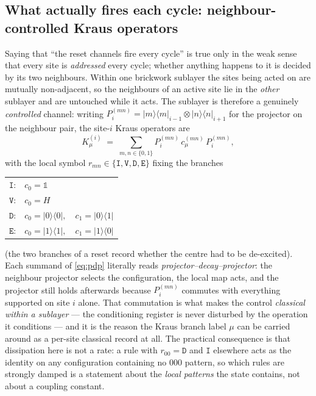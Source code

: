 \documentclass[11pt]{article}
\newcommand{\rt}[1]{\texttt{#1}}
\providecommand{\ket}[1]{|#1\rangle}
\providecommand{\bra}[1]{\langle #1|}
\begin{document}
\subsection{What actually fires each cycle: neighbour-controlled Kraus operators}
\label{sec:kraus}
Saying that ``the reset channels fire every cycle'' is true only in the weak
sense that every site is \emph{addressed} every cycle; whether anything happens
to it is decided by its two neighbours. Within one brickwork sublayer the sites
being acted on are mutually non-adjacent, so the neighbours of an active site lie
in the \emph{other} sublayer and are untouched while it acts. The sublayer is
therefore a genuinely \emph{controlled} channel: writing
$P^{(mn)}_i=\ket m\!\bra m_{i-1}\otimes\ket n\!\bra n_{i+1}$ for the projector on
the neighbour pair, the site-$i$ Kraus operators are
\begin{equation}
  K^{(i)}_\mu \;=\; \sum_{m,n\in\{0,1\}} P^{(mn)}_i\, c^{(mn)}_\mu\, P^{(mn)}_i ,
  \label{eq:pdp}
\end{equation}
with the local symbol $r_{mn}\in\{\rt I,\rt V,\rt D,\rt E\}$ fixing the branches
\begin{center}\small
\begin{tabular}{ll}
$\rt I$: & $c_0=\mathbb 1$ \\
$\rt V$: & $c_0=H$ \\
$\rt D$: & $c_0=\ket0\!\bra0,\quad c_1=\ket0\!\bra1$ \\
$\rt E$: & $c_0=\ket1\!\bra1,\quad c_1=\ket1\!\bra0$
\end{tabular}
\end{center}
(the two branches of a reset record whether the centre had to be de-excited).
Each summand of \eqref{eq:pdp} literally reads \emph{projector--decay--projector}:
the neighbour projector selects the configuration, the local map acts, and the
projector still holds afterwards because $P^{(mn)}_i$ commutes with everything
supported on site $i$ alone. That commutation is what makes the control
\emph{classical within a sublayer} --- the conditioning register is never
disturbed by the operation it conditions --- and it is the reason the Kraus
branch label $\mu$ can be carried around as a per-site classical record at all.
The practical consequence is that dissipation here is not a rate: a rule with
$r_{00}=\rt D$ and $\rt I$ elsewhere acts as the identity on any configuration
containing no $000$ pattern, so which rules are strongly damped is a statement
about the \emph{local patterns} the state contains, not about a coupling
constant.
\end{document}
